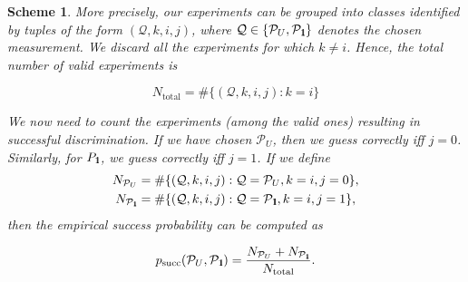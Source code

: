 \documentclass[preprint,12pt, a4paper]{elsarticle}
\newcommand{\1}{{\rm 1\hspace{-0.9mm}l}}
\newcommand{\Id}{{\rm 1\hspace{-0.9mm}l}}
\newcommand{\PP}{\mathcal{P}}
\newcommand{\QQ}{\mathcal{Q}}
\newtheorem{scheme}{Scheme}
\begin{document}
\begin{scheme}
More precisely, our experiments can be grouped into classes identified by tuples of the form
$(\mathcal{Q}, k, i, j)$, where $\mathcal{Q} \in \{\PP_U, \PP_\Id\}$ denotes the chosen measurement.
We discard all the experiments for which $k \ne i$. Hence, the total number of valid experiments is

\begin{equation}
	N_\text{total} = \#\{(\QQ, k, i, j): k = i \}
\end{equation}

We now need to count the experiments (among the valid ones) resulting in successful discrimination.
If we have chosen $\PP_U$, then we guess correctly iff $j=0$. Similarly, for
$P_\Id$, we guess correctly iff $j=1$. If we define
\begin{eqnarray}
	N_{\PP_U} &= \#\{(\mathcal{Q}, k, i, j): \mathcal{Q} = \PP_U, k = i, j = 0\}, \\
	N_{\PP_\Id} &= \#\{(\mathcal{Q}, k, i, j): \mathcal{Q} = \PP_\Id, k = i, j = 1\},
\end{eqnarray}
then the empirical success probability can be computed as

\begin{equation}
p_{\text{succ}}(\PP_{U}, \PP_{\Id}) = \frac{N_{\PP_U} + N_{\PP_\Id}}{N_{\text{total}}}.
\end{equation}

\end{scheme}
\end{document}
